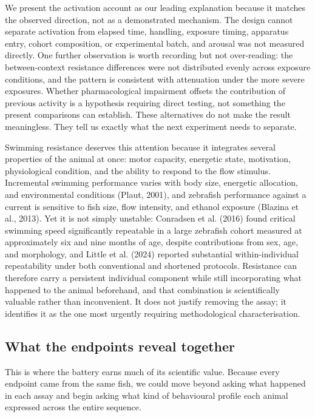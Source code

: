 \documentclass[12pt,a4paper]{article}
\begin{document}
We present the activation account as our leading explanation because it matches the observed direction, not as a demonstrated mechanism. The design cannot separate activation from elapsed time, handling, exposure timing, apparatus entry, cohort composition, or experimental batch, and arousal was not measured directly. One further observation is worth recording but not over-reading: the between-context resistance differences were not distributed evenly across exposure conditions, and the pattern is consistent with attenuation under the more severe exposures. Whether pharmacological impairment offsets the contribution of previous activity is a hypothesis requiring direct testing, not something the present comparisons can establish. These alternatives do not make the result meaningless. They tell us exactly what the next experiment needs to separate.

Swimming resistance deserves this attention because it integrates several properties of the animal at once: motor capacity, energetic state, motivation, physiological condition, and the ability to respond to the flow stimulus. Incremental swimming performance varies with body size, energetic allocation, and environmental conditions (Plaut, 2001), and zebrafish performance against a current is sensitive to fish size, flow intensity, and ethanol exposure (Blazina et al., 2013). Yet it is not simply unstable: Conradsen et al. (2016) found critical swimming speed significantly repeatable in a large zebrafish cohort measured at approximately six and nine months of age, despite contributions from sex, age, and morphology, and Little et al. (2024) reported substantial within-individual repeatability under both conventional and shortened protocols. Resistance can therefore carry a persistent individual component while still incorporating what happened to the animal beforehand, and that combination is scientifically valuable rather than inconvenient. It does not justify removing the assay; it identifies it as the one most urgently requiring methodological characterisation.

\subsection{What the endpoints reveal together}

This is where the battery earns much of its scientific value. Because every endpoint came from the same fish, we could move beyond asking what happened in each assay and begin asking what kind of behavioural profile each animal expressed across the entire sequence.
\end{document}
